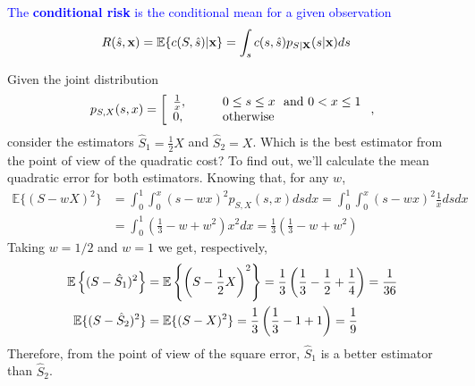 \textcolor{blue}{The {\bf conditional risk} is the conditional mean for a given observation
\begin{align}
\label{Est:cond_risk}
R(\hat s, {\bf x}) = \mathbb{E}\{c(S, \hat s) |{\bf x}\} 
           & = \int_s c(s,\hat s) p_{S|{\bf X}}(s|{\bf x}) ds
\end{align}}


\begin{example}
\label{CalculoECM}
Given the joint distribution
\begin{equation}
p_{S,X}(s,x) = \left[
\begin{array}{ll}
\frac{1}{x}, & \qquad 0 \le s \le x ~~{\rm and}~ 0 < x \le 1 \\
0,           & \qquad \text{otherwise}
\end{array}
\right.,
\end{equation}
consider the estimators $\hat{S}_1 = \frac{1}{2}X$ and $\hat{S}_2 = X$. Which is the best estimator from the point of view of the quadratic cost? To find out, we'll calculate the mean quadratic error for both estimators.
Knowing that, for any $w$,
\begin{align}
\mathbb{E}\{(S-wX)^2\}   
 &= \int_0^1 \int_0^x (s-wx)^2 p_{S,X}(s,x) ds dx   
  = \int_0^1 \int_0^x (s-wx)^2 \frac{1}{x}ds dx   \nonumber\\
 &= \int_0^1 \left(\frac{1}{3} - w  + w^2 \right) x^2 dx  
  = \frac{1}{3}\left(\frac{1}{3} - w  + w^2 \right) 
\end{align}
Taking $w=1/2$ and $w=1$ we get, respectively,
\begin{align}
\mathbb{E}\left\{(S-\hat{S}_1)^2\right\} 
	&= \mathbb{E}\left\{\left(S-\frac12 X\right)^2\right\}   
     = \frac{1}{3}\left(\frac{1}{3} - \frac{1}{2}  + \frac{1}{4} \right)
     = \frac{1}{36} \\
\mathbb{E}\{(S-\hat{S}_2)^2\} & = \mathbb{E}\{(S-X)^2\}   
 = \frac{1}{3}\left(\frac{1}{3} - 1  + 1 \right) = \frac{1}{9}
\end{align}
Therefore, from the point of view of the square error, $\hat{S}_1$ is a better estimator than $\hat{S}_2$.
\end{example} \vspace{0.2cm}


